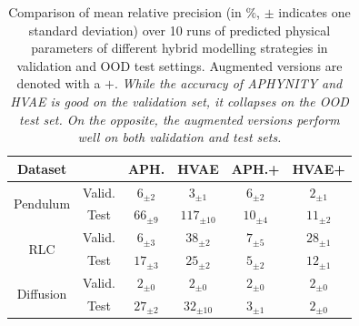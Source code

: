 \begin{table}[]
    \small
    \centering
    \setlength{\tabcolsep}{4pt}
    \begin{tabular}{c c|c c | c c}
        Dataset & & APH. & HVAE & APH.+ & HVAE+ \\ \hline
       \multirow{2}{*}{Pendulum} & Valid. & $6_{\pm 2}$ & $3_{\pm 1}$ & $6_{\pm 2}$ & $2_{\pm 1}$ \\
        & Test & $66_{\pm 9}$ & $117_{\pm 10}$ & $10_{\pm 4}$ & $11_{\pm 2}$    \\ \hline
       \multirow{2}{*}{RLC} & Valid. & $6_{\pm 3}$ & $38_{\pm 2}$ & $7_{\pm 5}$ & $28_{\pm 1}$ \\
        & Test & $17_{\pm 3}$ & $25_{\pm 2}$ & $5_{\pm 2}$ & $12_{\pm 1}$ \\ \hline

       \multirow{2}{*}{Diffusion} & Valid. & $2_{\pm 0}$ & $2_{\pm 0}$ & $2_{\pm 0}$ & $2_{\pm 0}$ \\
        & Test & $27_{\pm 2}$ & $32_{\pm 10}$ & $3_{\pm 1}$ & $2_{\pm 0}$\\ \hline
    \end{tabular}
    \caption{Comparison of mean relative precision (in $\%$, $\pm$ indicates one standard deviation) over 10 runs of predicted physical parameters of different hybrid modelling strategies in validation and OOD test settings. Augmented versions are denoted with a $+$. \textit{While the accuracy of APHYNITY and HVAE is good on the validation set, it collapses on the OOD test set. On the opposite, the augmented versions perform well on both validation and test sets.}}
    \label{tab:param_acc}
    \vspace{-1.5em}
\end{table}

